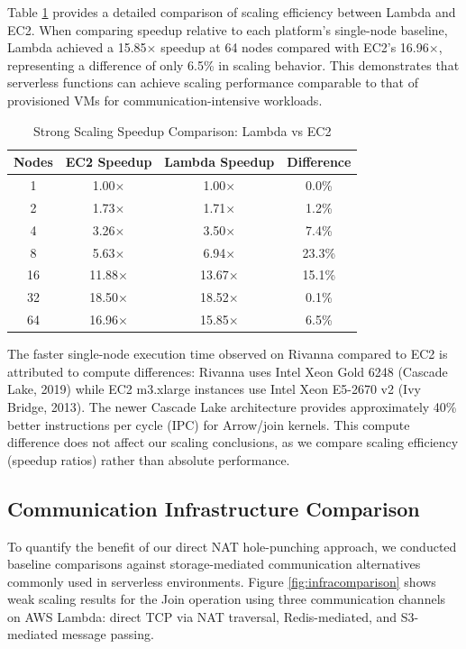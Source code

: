 \documentclass[conference]{IEEEtran}
\begin{document}
Table \ref{tab:speedup-comparison} provides a detailed comparison of scaling efficiency between Lambda and EC2. When comparing speedup relative to each platform's single-node baseline, Lambda achieved a 15.85$\times$ speedup at 64 nodes compared with EC2's 16.96$\times$, representing a difference of only 6.5\% in scaling behavior. This demonstrates that serverless functions can achieve scaling performance comparable to that of provisioned VMs for communication-intensive workloads.

\begin{table}[ht]
\centering
\caption{Strong Scaling Speedup Comparison: Lambda vs EC2}
\label{tab:speedup-comparison}
\begin{tabular}{|c|c|c|c|}
\hline
\textbf{Nodes} & \textbf{EC2 Speedup} & \textbf{Lambda Speedup} & \textbf{Difference} \\
\hline
1 & 1.00$\times$ & 1.00$\times$ & 0.0\% \\
2 & 1.73$\times$ & 1.71$\times$ & 1.2\% \\
4 & 3.26$\times$ & 3.50$\times$ & 7.4\% \\
8 & 5.63$\times$ & 6.94$\times$ & 23.3\% \\
16 & 11.88$\times$ & 13.67$\times$ & 15.1\% \\
32 & 18.50$\times$ & 18.52$\times$ & 0.1\% \\
64 & 16.96$\times$ & 15.85$\times$ & 6.5\% \\
\hline
\end{tabular}
\end{table}

The faster single-node execution time observed on Rivanna compared to EC2 is attributed to compute differences: Rivanna uses Intel Xeon Gold 6248 (Cascade Lake, 2019) while EC2 m3.xlarge instances use Intel Xeon E5-2670 v2 (Ivy Bridge, 2013). The newer Cascade Lake architecture provides approximately 40\% better instructions per cycle (IPC) for Arrow/join kernels. This compute difference does not affect our scaling conclusions, as we compare scaling efficiency (speedup ratios) rather than absolute performance.

\subsection{Communication Infrastructure Comparison}

To quantify the benefit of our direct NAT hole-punching approach, we conducted baseline comparisons against storage-mediated communication alternatives commonly used in serverless environments. Figure \ref{fig:infracomparison} shows weak scaling results for the Join operation using three communication channels on AWS Lambda: direct TCP via NAT traversal, Redis-mediated, and S3-mediated message passing.
\end{document}
